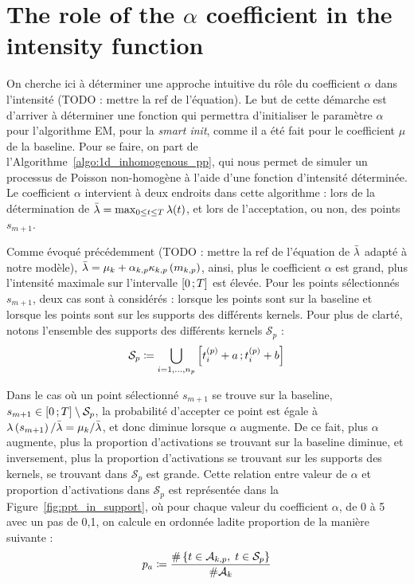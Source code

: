 \section{The role of the \texorpdfstring{$\alpha$}{TEXT} coefficient in the intensity function}\label{app:role_alpha_coef}

On cherche ici à déterminer une approche intuitive du rôle du coefficient $\alpha$ dans l'intensité (TODO : mettre la ref de l'équation).
Le but de cette démarche est d'arriver à déterminer une fonction qui permettra d'initialiser le paramètre $\alpha$ pour l'algorithme EM, pour la \textit{smart init}, comme il a été fait pour le coefficient $\mu$ de la baseline.
Pour se faire, on part de l'Algorithme~\ref{algo:1d_inhomogenous_pp}, qui nous permet de simuler un processus de Poisson non-homogène à l'aide d'une fonction d'intensité déterminée.
Le coefficient $\alpha$ intervient à deux endroits dans cette algorithme : lors de la détermination de $\Bar{\lambda} = \max_{0 \leq t \leq T} \lambda(t)$, et lors de l'acceptation, ou non, des points $s_{m+1}$.

Comme évoqué précédemment (TODO : mettre la ref de l'équation de $\Bar{\lambda}$ adapté à notre modèle), $\Bar{\lambda} = \mu_k + \alpha_{k,p}\kappa_{k,p}\left( m_{k,p} \right)$, ainsi, plus le coefficient $\alpha$ est grand, plus l'intensité maximale sur l'intervalle $\left[ 0 \, ; T \right]$ est élevée.
Pour les points sélectionnés $s_{m+1}$, deux cas sont à considérés : lorsque les points sont sur la baseline et lorsque les points sont sur les supports des différents kernels.
Pour plus de clarté, notons l'ensemble des supports des différents kernels $\mathcal{S}_{p}$ :
\begin{equation}
    \mathcal{S}_{p} \coloneqq \bigcup_{i = 1,\dots,n_p} \left[ t^{(p)}_i + a \, ; t^{(p)}_i + b \right]
\end{equation}

Dans le cas où un point sélectionné $s_{m+1}$ se trouve sur la baseline, \cad $s_{m+1} \in \left[ 0 \, ; T \right] \setminus \mathcal{S}_{p}$, la probabilité d'accepter ce point est égale à $\lambda\left( s_{m+1} \right) / \Bar{\lambda} = \mu_k / \Bar{\lambda}$, et donc diminue lorsque $\alpha$ augmente.
De ce fait, plus $\alpha$ augmente, plus la proportion d'activations se trouvant sur la baseline diminue, et inversement, plus la proportion d'activations se trouvant sur les supports des kernels, \cad se trouvant dans $\mathcal{S}_{p}$ est grande.
Cette relation entre valeur de $\alpha$ et proportion d'activations dans $\mathcal{S}_{p}$ est représentée dans la Figure~\ref{fig:ppt_in_support}, où pour chaque valeur du coefficient $\alpha$, de 0 à 5 avec un pas de 0,1, on calcule en ordonnée ladite proportion de la manière suivante :
\begin{equation}
    p_a \coloneqq \frac{\#\left\lbrace t\in\mathcal{A}_{k,p},\; t\in\mathcal{S}_{p} \right\rbrace}{\# \mathcal{A}_k}
\end{equation}

